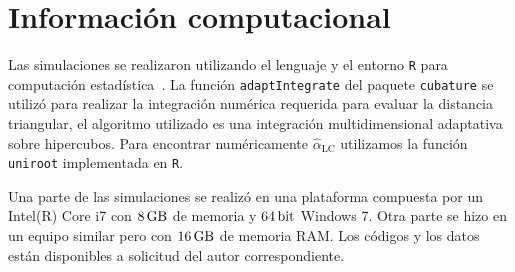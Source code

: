 \chapter{Información computacional}


Las simulaciones se realizaron utilizando el lenguaje y el entorno \texttt R para computación estadística~\cite{RLanguage}.
La función \texttt{adaptIntegrate} del paquete \texttt{cubature} se utilizó para realizar la integración numérica requerida para evaluar la distancia triangular, el algoritmo utilizado es una integración multidimensional adaptativa sobre hipercubos. Para encontrar numéricamente $\widehat\alpha_{\text{LC}}$ utilizamos la función \texttt{uniroot} implementada en \texttt R.

Una parte de las simulaciones se realizó en una plataforma compuesta por un Intel(R) Core i7 con $\SI{8}{\giga\byte}$ de memoria y $\SI{64}{\bit}$  Windows  7. Otra parte se hizo en un equipo similar pero con $\SI{16}{\giga\byte}$ de memoria RAM.
Los códigos y los datos están disponibles a solicitud del autor correspondiente.